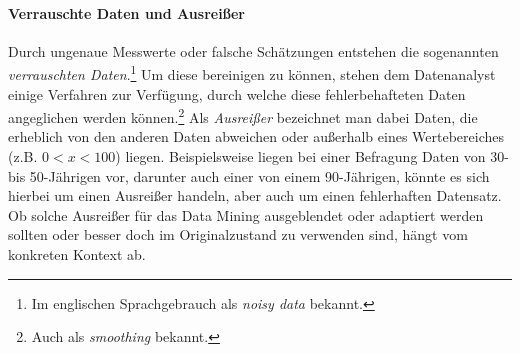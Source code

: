 \paragraph{Verrauschte Daten und Ausreißer}
\label{outlierchapter}
Durch ungenaue Messwerte oder falsche Schätzungen entstehen die sogenannten \textit{verrauschten Daten}.\footnote{Im englischen Sprachgebrauch als \textit{noisy data} bekannt.} Um diese bereinigen zu können, stehen dem Datenanalyst einige Verfahren zur Verfügung, durch welche diese fehlerbehafteten Daten angeglichen werden können.\footnote{Auch als \textit{smoothing} bekannt.} Als \textit{Ausreißer} bezeichnet man dabei Daten, die erheblich von den anderen Daten abweichen oder außerhalb eines Wertebereiches (z.B. $0<x<100$) liegen. Beispielsweise liegen bei einer Befragung Daten von 30- bis 50-Jährigen vor, darunter auch einer von einem 90-Jährigen, könnte es sich hierbei um einen Ausreißer handeln, aber auch um einen fehlerhaften Datensatz. \glqq Ob solche Ausreißer für das Data Mining ausgeblendet oder adaptiert werden sollten oder besser doch im Originalzustand zu verwenden sind, hängt vom konkreten Kontext ab.\grqq{}


